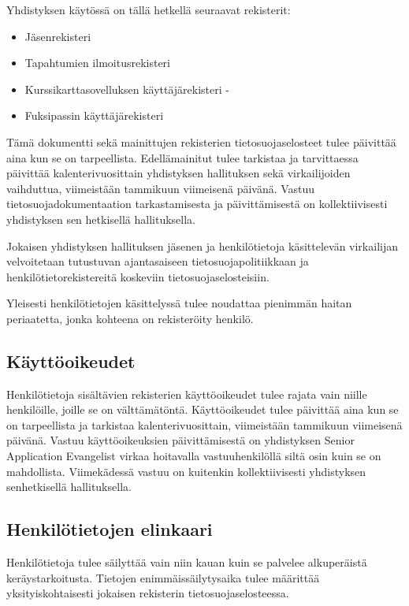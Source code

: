 \documentclass[finnish]{tktltiki}
\begin{document}
Yhdistyksen käytössä on tällä hetkellä seuraavat rekisterit:

\begin{itemize}
\item Jäsenrekisteri  
\item Tapahtumien ilmoitusrekisteri
\item Kurssikarttasovelluksen käyttäjärekisteri
-\item Fuksipassin käyttäjärekisteri
\end{itemize}
Tämä dokumentti sekä mainittujen rekisterien tietosuojaselosteet tulee päivittää aina kun se on tarpeellista. Edellämainitut tulee tarkistaa ja tarvittaessa päivittää kalenterivuosittain yhdistyksen hallituksen sekä virkailijoiden vaihduttua, viimeistään tammikuun viimeisenä päivänä. Vastuu tietosuojadokumentaation tarkastamisesta ja päivittämisestä on kollektiivisesti yhdistyksen sen hetkisellä hallituksella.

Jokaisen yhdistyksen hallituksen jäsenen ja henkilötietoja käsittelevän virkailijan velvoitetaan tutustuvan ajantasaiseen tietosuojapolitiikkaan ja henkilötietorekistereitä koskeviin tietosuojaselosteisiin.

Yleisesti henkilötietojen käsittelyssä tulee noudattaa pienimmän haitan periaatetta, jonka kohteena on rekisteröity henkilö.


\subsection*{Käyttöoikeudet}

Henkilötietoja sisältävien rekisterien käyttöoikeudet tulee rajata vain niille henkilöille, joille se on välttämätöntä. Käyttöoikeudet tulee päivittää aina kun se on tarpeellista ja tarkistaa kalenterivuosittain, viimeistään tammikuun viimeisenä päivänä. Vastuu käyttöoikeuksien päivittämisestä on yhdistyksen Senior Application Evangelist virkaa hoitavalla vastuuhenkilöllä siltä osin kuin se on mahdollista. Viimekädessä vastuu on kuitenkin kollektiivisesti yhdistyksen senhetkisellä hallituksella.


\subsection*{Henkilötietojen elinkaari}

Henkilötietoja tulee säilyttää vain niin kauan kuin se palvelee alkuperäistä keräystarkoitusta. Tietojen enimmäissäilytysaika tulee määrittää yksityiskohtaisesti jokaisen rekisterin tietosuojaselosteessa.
\end{document}
